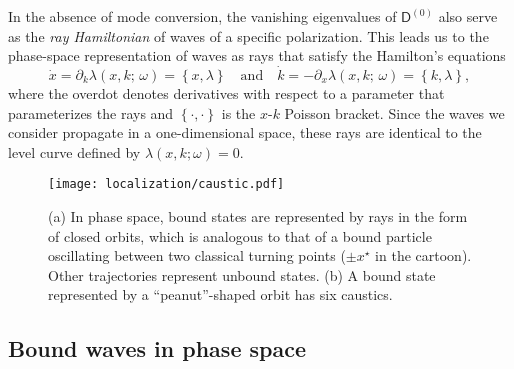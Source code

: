 In the absence of mode conversion, the vanishing eigenvalues of $\mathsf{D}^{(0)}$ also serve as the \emph{ray Hamiltonian} of waves of a specific polarization.
 This leads us to the phase-space representation of waves as rays that satisfy the Hamilton's equations
%
\begin{equation}
  \dot{x} = \partial_{k} \lambda(x, k;\, \omega) = \left\{x, \lambda\right\}
  \quad\text{and}\quad
  \dot{k} = -\partial_{x} \lambda(x, k;\, \omega) = \left\{k, \lambda\right\},
\end{equation}
%
where the overdot denotes derivatives with respect to a parameter that parameterizes the rays and $\left\{\cdot, \cdot\right\}$ is the $x$-$k$ Poisson bracket.
Since the waves we consider propagate in a one-dimensional space, these rays are identical to the level curve defined by $\lambda(x, k; \omega) = 0$.
%
\begin{figure}
  \begin{center}
    \texttt{[image: localization/caustic.pdf]}
  \end{center}
  \caption{%
    (a) In phase space, bound states are represented by rays in the form of closed orbits, which is analogous to that of a bound particle oscillating between two classical turning points ($\pm x^{\star}$ in the cartoon).
    Other trajectories represent unbound states.
    (b) A bound state represented by a ``peanut''-shaped orbit has six caustics.%
  }
  \label{fig:caustic}
\end{figure}

\subsection{Bound waves in phase space}

